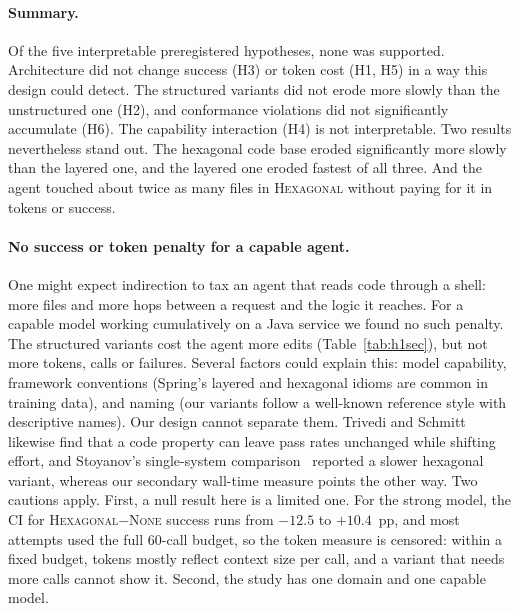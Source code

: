 \documentclass[10pt]{article}
\newcommand{\NONE}{\textsc{None}}
\newcommand{\HEX}{\textsc{Hexagonal}}
\begin{document}
\paragraph{Summary.} Of the five interpretable preregistered hypotheses, none was supported.
Architecture did not change success (H3) or token cost (H1, H5) in a way this design could detect.
The structured variants did not erode more slowly than the unstructured one (H2), and conformance
violations did not significantly accumulate (H6). The capability interaction (H4) is not
interpretable. Two results nevertheless stand out. The hexagonal code base eroded significantly more
slowly than the layered one, and the layered one eroded fastest of all three. And the agent
touched about twice as many files in \HEX{} without paying for it in tokens or success.

\paragraph{No success or token penalty for a capable agent.} One might expect indirection to
tax an agent that reads code through a shell: more files and more hops between a request and the
logic it reaches. For a capable model working cumulatively on a Java service we found no such
penalty. The structured variants cost the agent more edits (Table~\ref{tab:h1sec}), but not more
tokens, calls or failures. Several factors could explain this: model capability, framework
conventions (Spring's layered and hexagonal idioms are common in training data), and naming (our
variants follow a well-known reference style with descriptive names). Our design cannot separate
them. Trivedi and
Schmitt~\citep{trivedi2026cleanliness} likewise find that a code property can leave pass rates
unchanged while shifting effort, and Stoyanov's single-system comparison~\citep{stoyanov2026hexagonal}
reported a slower hexagonal variant, whereas our secondary wall-time measure points the other way.
Two cautions apply. First, a null result here is a limited one. For the strong model, the CI for
\HEX$-$\NONE{} success runs from $-12.5$ to $+10.4$~pp, and most attempts used the full 60-call budget, so
the token measure is censored: within a fixed budget, tokens mostly reflect context size per call,
and a variant that needs more calls cannot show it. Second, the study has one domain and one capable
model.
\end{document}
